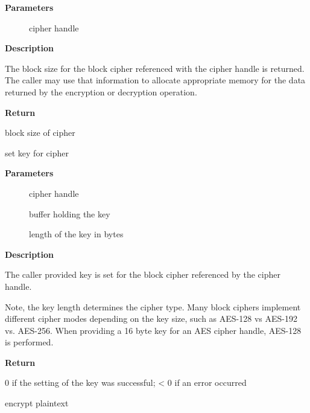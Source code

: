 \documentclass[a4paper,8pt,english]{sphinxmanual}
\begin{document}
\textbf{Parameters}
\begin{description}
\item[{}] \leavevmode
cipher handle

\end{description}

\textbf{Description}

The block size for the block cipher referenced with the cipher handle is
returned. The caller may use that information to allocate appropriate
memory for the data returned by the encryption or decryption operation.

\textbf{Return}

block size of cipher

\begin{fulllineitems}
\label{crypto/api-skcipher:c.crypto_blkcipher_setkey}
set key for cipher

\end{fulllineitems}


\textbf{Parameters}
\begin{description}
\item[{}] \leavevmode
cipher handle

\item[{}] \leavevmode
buffer holding the key

\item[{}] \leavevmode
length of the key in bytes

\end{description}

\textbf{Description}

The caller provided key is set for the block cipher referenced by the cipher
handle.

Note, the key length determines the cipher type. Many block ciphers implement
different cipher modes depending on the key size, such as AES-128 vs AES-192
vs. AES-256. When providing a 16 byte key for an AES cipher handle, AES-128
is performed.

\textbf{Return}

0 if the setting of the key was successful; \textless{} 0 if an error occurred

\begin{fulllineitems}
\label{crypto/api-skcipher:c.crypto_blkcipher_encrypt}
encrypt plaintext

\end{fulllineitems}
\end{document}
